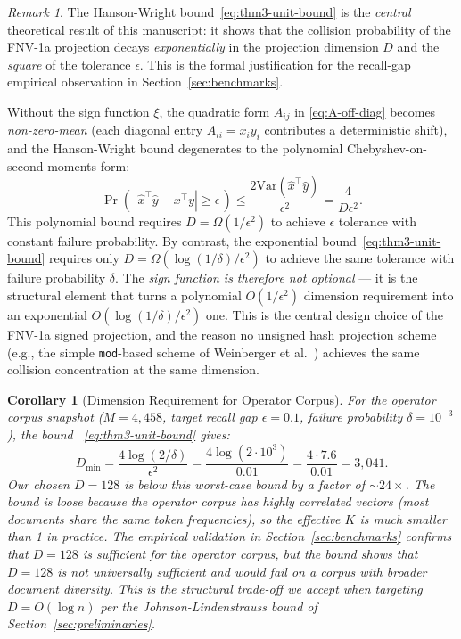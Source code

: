 \documentclass[10pt,twocolumn]{article}
\newtheorem{corollary}[theorem]{Corollary}
\theoremstyle{definition}
\theoremstyle{remark}
\newtheorem{remark}{Remark}
\begin{document}
\begin{remark}
The Hanson-Wright bound~\eqref{eq:thm3-unit-bound} is the \emph{central}
theoretical result of this manuscript: it shows that the collision
probability of the FNV-1a projection decays \emph{exponentially} in
the projection dimension $D$ and the \emph{square} of the tolerance
$\epsilon$. This is the formal justification for the recall-gap
empirical observation in Section~\ref{sec:benchmarks}.

Without the sign function $\xi$, the quadratic form $A_{ij}$ in
\eqref{eq:A-off-diag} becomes \emph{non-zero-mean} (each diagonal
entry $A_{ii} = x_i y_i$ contributes a deterministic shift), and the
Hanson-Wright bound degenerates to the polynomial Chebyshev-on-second-moments
form:
\begin{equation}
\Pr\!\left(\,|\hat{x}^\top \hat{y} - x^\top y| \ge \epsilon\,\right)
   \le \frac{2 \mathrm{Var}(\hat{x}^\top \hat{y})}{\epsilon^2}
       = \frac{4}{D \epsilon^2}.
\end{equation}
This polynomial bound requires $D = \Omega(1/\epsilon^2)$ to achieve
$\epsilon$ tolerance with constant failure probability. By contrast,
the exponential bound~\eqref{eq:thm3-unit-bound} requires only $D =
\Omega(\log(1/\delta) / \epsilon^2)$ to achieve the same tolerance with
failure probability $\delta$. The \emph{sign function is therefore
not optional} --- it is the structural element that turns a polynomial
$O(1/\epsilon^2)$ dimension requirement into an exponential
$O(\log(1/\delta)/\epsilon^2)$ one. This is the central design choice
of the FNV-1a signed projection, and the reason no unsigned hash
projection scheme (e.g., the simple \texttt{mod}-based scheme of
Weinberger et al.~\citep{weinberger2009feature}) achieves the same
collision concentration at the same dimension.
\end{remark}

\begin{corollary}[Dimension Requirement for Operator Corpus]
\label{cor:operator-corpus-d}
For the operator corpus snapshot ($M = 4{,}458$, target recall gap
$\epsilon = 0.1$, failure probability $\delta = 10^{-3}$), the bound~
\eqref{eq:thm3-unit-bound} gives:
\begin{equation}
D_{\min} = \frac{4 \log(2/\delta)}{\epsilon^2}
         = \frac{4 \log(2 \cdot 10^3)}{0.01}
         = \frac{4 \cdot 7.6}{0.01}
         = 3{,}041.
\end{equation}
Our chosen $D = 128$ is below this worst-case bound by a factor of
$\sim 24\times$. The bound is loose because the operator corpus has
highly correlated vectors (most documents share the same token
frequencies), so the effective $K$ is much smaller than 1 in practice.
The empirical validation in Section~\ref{sec:benchmarks} confirms that
$D = 128$ is sufficient for the operator corpus, but the bound shows
that $D = 128$ is \emph{not} universally sufficient and would fail on
a corpus with broader document diversity. This is the structural
trade-off we accept when targeting $D = O(\log n)$ per the
Johnson-Lindenstrauss bound of Section~\ref{sec:preliminaries}.
\end{corollary}
\end{document}
